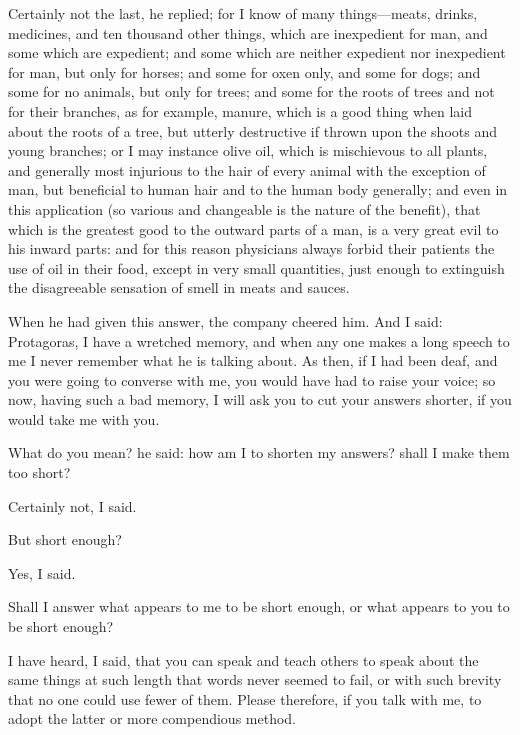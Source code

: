 \documentclass[11pt,letter]{article}
\begin{document}
\par  Certainly not the last, he replied; for I know of many things—meats, drinks, medicines, and ten thousand other things, which are inexpedient for man, and some which are expedient; and some which are neither expedient nor inexpedient for man, but only for horses; and some for oxen only, and some for dogs; and some for no animals, but only for trees; and some for the roots of trees and not for their branches, as for example, manure, which is a good thing when laid about the roots of a tree, but utterly destructive if thrown upon the shoots and young branches; or I may instance olive oil, which is mischievous to all plants, and generally most injurious to the hair of every animal with the exception of man, but beneficial to human hair and to the human body generally; and even in this application (so various and changeable is the nature of the benefit), that which is the greatest good to the outward parts of a man, is a very great evil to his inward parts: and for this reason physicians always forbid their patients the use of oil in their food, except in very small quantities, just enough to extinguish the disagreeable sensation of smell in meats and sauces.

\par  When he had given this answer, the company cheered him. And I said: Protagoras, I have a wretched memory, and when any one makes a long speech to me I never remember what he is talking about. As then, if I had been deaf, and you were going to converse with me, you would have had to raise your voice; so now, having such a bad memory, I will ask you to cut your answers shorter, if you would take me with you.

\par  What do you mean? he said: how am I to shorten my answers? shall I make them too short?

\par  Certainly not, I said.

\par  But short enough?

\par  Yes, I said.

\par  Shall I answer what appears to me to be short enough, or what appears to you to be short enough?

\par  I have heard, I said, that you can speak and teach others to speak about the same things at such length that words never seemed to fail, or with such brevity that no one could use fewer of them. Please therefore, if you talk with me, to adopt the latter or more compendious method.
\end{document}
